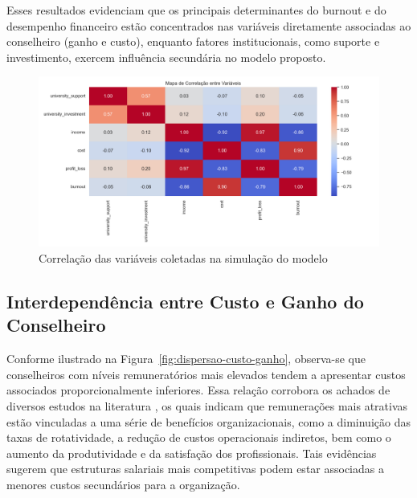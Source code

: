 \documentclass[
	article,			%
	11pt,				%
	oneside,			%
	a4paper,			%
	english,			%
	brazil,				%
	sumario=tradicional
	]{abntex2}
\begin{document}
Esses resultados evidenciam que os principais determinantes do burnout e do desempenho financeiro estão concentrados nas variáveis diretamente associadas ao conselheiro (ganho e custo), enquanto fatores institucionais, como suporte e investimento, exercem influência secundária no modelo proposto.

\begin{figure}[H]
    \centering
    \includegraphics[width=1\textwidth]{imagens/heatmap_correlacao.png}
    \caption{Correlação das variáveis coletadas na simulação do modelo}
    \label{fig:correlacao-heatmap}
\end{figure}

\subsection{Interdependência entre Custo e Ganho do Conselheiro}

Conforme ilustrado na Figura~\ref{fig:dispersao-custo-ganho}, observa-se que conselheiros com níveis remuneratórios mais elevados tendem a apresentar custos associados proporcionalmente inferiores. 
Essa relação corrobora os achados de diversos estudos na literatura \cite{Judge2010, Jung2015, Chao2015, OrtinAngel2004, Singh2010}, os quais indicam que remunerações mais atrativas estão vinculadas a uma série de benefícios organizacionais, como a diminuição das taxas de rotatividade, a redução de custos operacionais indiretos, bem como o aumento da produtividade e da satisfação dos profissionais. Tais evidências sugerem que estruturas salariais mais competitivas podem estar associadas a menores custos secundários para a organização.
\end{document}
